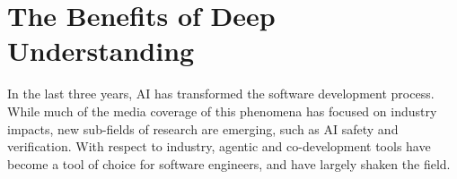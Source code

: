 
\section{The Benefits of Deep Understanding}
\label{sec:deep_understanding}

In the last three years, AI has transformed the software development process.
While much of the media coverage of this phenomena has focused on industry impacts, new sub-fields of research are emerging, such as AI safety and verification.
With respect to industry, agentic and co-development tools have become a tool of choice for software engineers, and have largely shaken the field.
